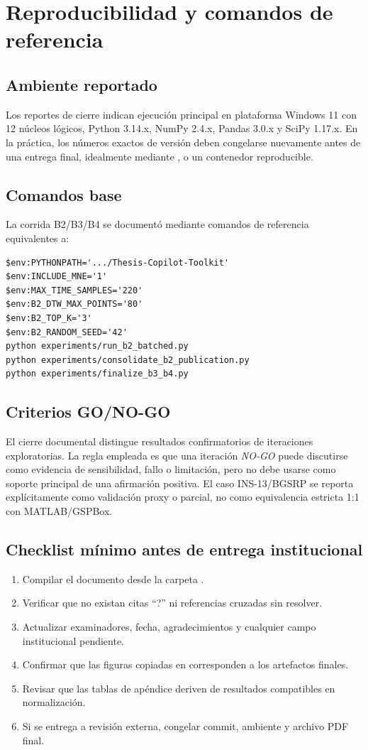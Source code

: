 \chapter{Reproducibilidad y comandos de referencia}
\label{app:reproducibilidad}

\section{Ambiente reportado}
Los reportes de cierre indican ejecución principal en plataforma Windows 11 con 12 núcleos lógicos, Python 3.14.x, NumPy 2.4.x, Pandas 3.0.x y SciPy 1.17.x. En la práctica, los números exactos de versión deben congelarse nuevamente antes de una entrega final, idealmente mediante ,  o un contenedor reproducible.

\section{Comandos base}
La corrida B2/B3/B4 se documentó mediante comandos de referencia equivalentes a:
\begin{verbatim}
$env:PYTHONPATH='.../Thesis-Copilot-Toolkit'
$env:INCLUDE_MNE='1'
$env:MAX_TIME_SAMPLES='220'
$env:B2_DTW_MAX_POINTS='80'
$env:B2_TOP_K='3'
$env:B2_RANDOM_SEED='42'
python experiments/run_b2_batched.py
python experiments/consolidate_b2_publication.py
python experiments/finalize_b3_b4.py
\end{verbatim}

\section{Criterios GO/NO-GO}
El cierre documental distingue resultados confirmatorios de iteraciones exploratorias. La regla empleada es que una iteración \textit{NO-GO} puede discutirse como evidencia de sensibilidad, fallo o limitación, pero no debe usarse como soporte principal de una afirmación positiva. El caso INS-13/BGSRP se reporta explícitamente como validación proxy o parcial, no como equivalencia estricta 1:1 con MATLAB/GSPBox.

\section{Checklist mínimo antes de entrega institucional}
\begin{enumerate}
\item Compilar el documento desde la carpeta .
\item Verificar que no existan citas ``?'' ni referencias cruzadas sin resolver.
\item Actualizar examinadores, fecha, agradecimientos y cualquier campo institucional pendiente.
\item Confirmar que las figuras copiadas en  corresponden a los artefactos finales.
\item Revisar que las tablas de apéndice deriven de resultados compatibles en normalización.
\item Si se entrega a revisión externa, congelar commit, ambiente y archivo PDF final.
\end{enumerate}

